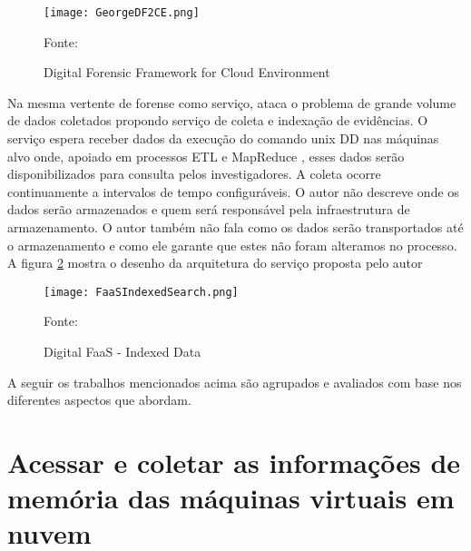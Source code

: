 \begin{figure}[htb!]
\footnotesize
\caption{Digital Forensic Framework for Cloud Environment}
\texttt{[image: GeorgeDF2CE.png]}
\centering
\label{fig:GeorgeDF2CE}
\begin{center}
Fonte: \cite{GeorgeDF2CE:2012} 
\end{center}
\end{figure}

Na mesma vertente de forense como serviço, \cite{FaaSIndexedSearch:2012} ataca o problema de grande volume de dados coletados propondo serviço de coleta e indexação de evidências.
%
O serviço espera receber dados da execução do comando unix DD \cite{UnixManPagesDD} nas máquinas alvo onde, apoiado em processos ETL e MapReduce \cite{WikipediaMapReduce}, esses dados serão disponibilizados para consulta pelos investigadores.
%
A coleta ocorre continuamente a intervalos de tempo configuráveis.
%
O autor não descreve onde os dados serão armazenados e quem será responsável pela infraestrutura de armazenamento.
%
O autor também não fala como os dados serão transportados até o armazenamento e como ele garante que estes não foram alteramos no processo.
%
A figura \ref{fig:FaaSIndexedSearch} mostra o desenho da arquitetura do serviço proposta pelo autor

\begin{figure}[htb!]
\footnotesize
\caption{Digital FaaS - Indexed Data}
\texttt{[image: FaaSIndexedSearch.png]}
\centering
\label{fig:FaaSIndexedSearch}
\begin{center}
Fonte: \cite{FaaSIndexedSearch:2012} 
\end{center}
\end{figure}

A seguir os trabalhos mencionados acima são agrupados e avaliados com base nos diferentes aspectos que abordam.

\section{Acessar e coletar as informações de memória das máquinas virtuais em nuvem}
\label{sec:coletadeevidencia}

